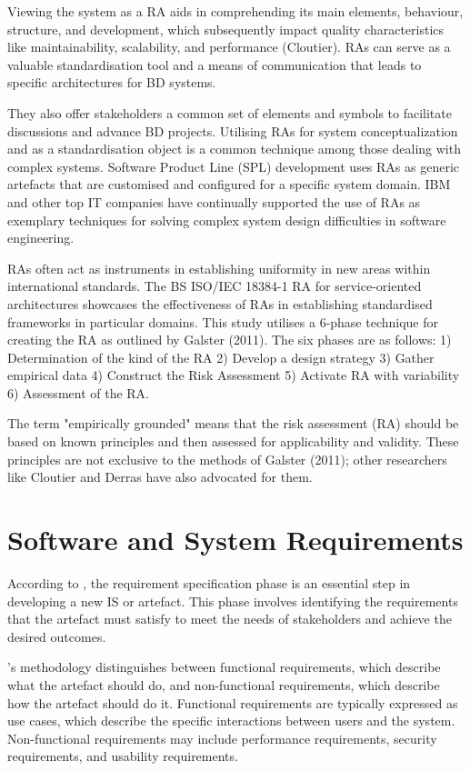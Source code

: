 \documentclass[journal]{IEEEtran}
\begin{document}
Viewing the system as a RA aids in comprehending its main elements, behaviour, structure, and development, which subsequently impact quality characteristics like maintainability, scalability, and performance (Cloutier). RAs can serve as a valuable standardisation tool and a means of communication that leads to specific architectures for BD systems. 

They also offer stakeholders a common set of elements and symbols to facilitate discussions and advance BD projects. Utilising RAs for system conceptualization and as a standardisation object is a common technique among those dealing with complex systems. Software Product Line (SPL) development uses RAs as generic artefacts that are customised and configured for a specific system domain. IBM and other top IT companies have continually supported the use of RAs as exemplary techniques for solving complex system design difficulties in software engineering. 

RAs often act as instruments in establishing uniformity in new areas within international standards. The BS ISO/IEC 18384-1 RA for service-oriented architectures showcases the effectiveness of RAs in establishing standardised frameworks in particular domains. This study utilises a 6-phase technique for creating the RA as outlined by Galster (2011). The six phases are as follows: 1) Determination of the kind of the RA 2) Develop a design strategy 3) Gather empirical data 4) Construct the Risk Assessment 5) Activate RA with variability 6) Assessment of the RA. 

The term "empirically grounded" means that the risk assessment (RA) should be based on known principles and then assessed for applicability and validity. These principles are not exclusive to the methods of Galster (2011); other researchers like Cloutier and Derras have also advocated for them.


\section{Software and System Requirements}
\label{sec:software_and_system_requirements}

According to \cite{wieringa2014design}\cite{wieringa2014design}, the requirement specification phase is an essential step in developing a new IS or artefact. This phase involves identifying the requirements that the artefact must satisfy to meet the needs of stakeholders and achieve the desired outcomes.

\cite{wieringa2014design}'s methodology distinguishes between functional requirements, which describe what the artefact should do, and non-functional requirements, which describe how the artefact should do it. Functional requirements are typically expressed as use cases, which describe the specific interactions between users and the system. Non-functional requirements may include performance requirements, security requirements, and usability requirements.
\end{document}
